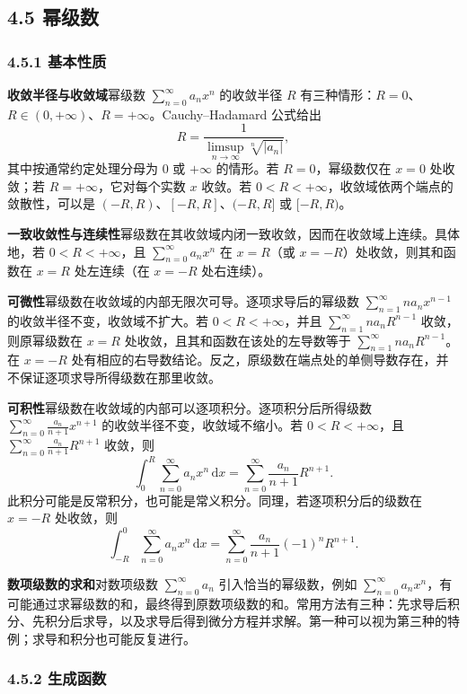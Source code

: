 \subsection*{4.5 幂级数}

\subsubsection*{4.5.1 基本性质}

\noindent\textbf{收敛半径与收敛域}\quad 幂级数 $\sum_{n=0}^{\infty}a_nx^n$ 的收敛半径 $R$ 有三种情形：$R=0$、$R\in(0,+\infty)$、$R=+\infty$。Cauchy--Hadamard 公式给出
\[
R=\frac1{\displaystyle\limsup_{n\to\infty}\sqrt[n]{|a_n|}},
\]
其中按通常约定处理分母为 $0$ 或 $+\infty$ 的情形。若 $R=0$，幂级数仅在 $x=0$ 处收敛；若 $R=+\infty$，它对每个实数 $x$ 收敛。若 $0<R<+\infty$，收敛域依两个端点的敛散性，可以是 $(-R,R)$、$[-R,R]$、$(-R,R]$ 或 $[-R,R)$。

\noindent\textbf{一致收敛性与连续性}\quad 幂级数在其收敛域内闭一致收敛，因而在收敛域上连续。具体地，若 $0<R<+\infty$，且 $\sum_{n=0}^{\infty}a_nx^n$ 在 $x=R$（或 $x=-R$）处收敛，则其和函数在 $x=R$ 处左连续（在 $x=-R$ 处右连续）。

\noindent\textbf{可微性}\quad 幂级数在收敛域的内部无限次可导。逐项求导后的幂级数 $\sum_{n=1}^{\infty}na_nx^{n-1}$ 的收敛半径不变，收敛域不扩大。若 $0<R<+\infty$，并且 $\sum_{n=1}^{\infty}na_nR^{n-1}$ 收敛，则原幂级数在 $x=R$ 处收敛，且其和函数在该处的左导数等于 $\sum_{n=1}^{\infty}na_nR^{n-1}$。在 $x=-R$ 处有相应的右导数结论。反之，原级数在端点处的单侧导数存在，并不保证逐项求导所得级数在那里收敛。

\noindent\textbf{可积性}\quad 幂级数在收敛域的内部可以逐项积分。逐项积分后所得级数 $\sum_{n=0}^{\infty}\frac{a_n}{n+1}x^{n+1}$ 的收敛半径不变，收敛域不缩小。若 $0<R<+\infty$，且 $\sum_{n=0}^{\infty}\frac{a_n}{n+1}R^{n+1}$ 收敛，则
\[
\int_0^R\sum_{n=0}^{\infty}a_nx^n\,\mathrm dx
=\sum_{n=0}^{\infty}\frac{a_n}{n+1}R^{n+1}.
\]
此积分可能是反常积分，也可能是常义积分。同理，若逐项积分后的级数在 $x=-R$ 处收敛，则
\[
\int_{-R}^{0}\sum_{n=0}^{\infty}a_nx^n\,\mathrm dx
=\sum_{n=0}^{\infty}\frac{a_n}{n+1}(-1)^nR^{n+1}.
\]

\noindent\textbf{数项级数的求和}\quad 对数项级数 $\sum_{n=0}^{\infty}a_n$ 引入恰当的幂级数，例如 $\sum_{n=0}^{\infty}a_nx^n$，有可能通过求幂级数的和，最终得到原数项级数的和。常用方法有三种：先求导后积分、先积分后求导，以及求导后得到微分方程并求解。第一种可以视为第三种的特例；求导和积分也可能反复进行。

\subsubsection*{4.5.2 生成函数}

